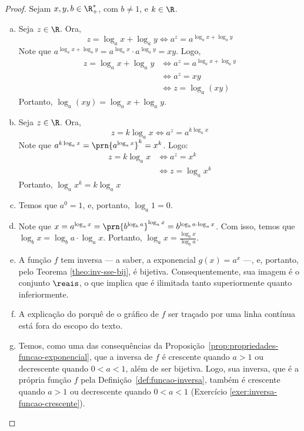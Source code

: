\begin{proof}
    Sejam $x, y, b \in \R_+^*$, com $b \neq 1$, e $k \in \R$.
    \begin{enumerate}[(a)]
        \item 
        Seja $z \in \R$. Ora,
        \[
            z = \log_a x + \log_a y \iff a^z = a^{\log_a x + \log_a y} 
        \]
        Note que $a^{\log_a x + \log_a y}  = a^{\log_a x} \cdot a^{\log_a y} = xy$.
        Logo, 
        \begin{align*}
            z = \log_a x + \log_a y & \iff a^z = a^{\log_a x + \log_a y}\\
            & \iff a^z = xy \\
            & \iff z = \log_a(xy)
        \end{align*}
        Portanto, $\log_a(xy)=\log_a x + \log_a y$.

        \item Seja $z \in \R$.
        Ora, 
        \[
            z = k \log_a x \iff a^z = a^{k\log_a x}
        \]
        Note que $a^{k\log_a x} = \prn{a^{\log_a x}}^k = x^k$.
        Logo:
        \begin{align*}
            z = k \log_a x & \iff a^z = x^k \\ &\iff z = \log_a {x^k}
        \end{align*}
        Portanto, $\log_a{x^k}=k\log_a x$

        \item Temos que $a^0 = 1$, e, portanto, $\log_a 1 = 0$.

        \item Note que $x = a^{\log_a x} = \prn{b^{\log_b a}}^{\log_a x} = b^{\log_b a \cdot \log_a x}$.
        Com isso, temos que $\log_b x = \log_b a \cdot \log_a x$. Portanto, $\log_a x = \frac{\log_b x}{\log_b a}$.

        \item A função $f$ tem inversa --- a saber, a exponencial $g(x) =  a^x$ ---, e, portanto, pelo Teorema \ref{theo:inv-sse-bij}, é bijetiva.
        Consequentemente, sua imagem é o conjunto $\reais$, o que implica que é ilimitada tanto superiormente quanto inferiormente.

        \item A explicação do porquê de o gráfico de $f$ ser traçado por uma linha contínua está fora do escopo do texto.

        \item Temos, como uma das consequências da Proposição~\ref{prop:propriedades-funcao-exponencial}, que a inversa de $f$ é crescente
        quando $a > 1$ ou decrescente quando $0 < a <1$, além de ser bijetiva.
        Logo, sua inversa, que é a própria função $f$ pela Definição~\ref{def:funcao-inversa}, também é crescente quando $a > 1$ ou decrescente
        quando $0 < a < 1$ (Exercício \ref{exer:inversa-funcao-crescente}).


    \end{enumerate}
\end{proof}

